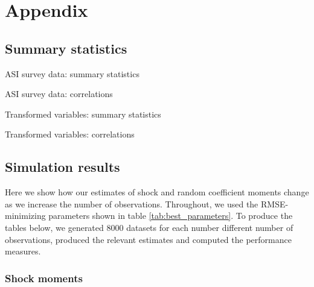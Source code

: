 \section{Appendix}

\subsection{Summary statistics} \label{sec:summary_statistics}



\begin{table}[H]
  \singlespacing
  \caption{ASI survey data: summary statistics}
  
  \label{tab:summary_statistics_raw1}
\end{table}

\begin{table}[H]
  \singlespacing
  \caption{ASI survey data: correlations}
  
  \label{tab:summary_statistics_raw2}
\end{table}


\begin{table}[H]
  \singlespacing
  \caption{Transformed variables: summary statistics}
  
  \label{tab:summary_statistics_processed1}
\end{table}

\begin{table}[H]
  \singlespacing
  \caption{Transformed variables: correlations}
  
  \label{tab:summary_statistics_processed2}
\end{table}


\subsection{Simulation results}

Here we show how our estimates of shock and random coefficient moments change as we increase the number of observations. Throughout, we used the RMSE-minimizing parameters shown in table \ref{tab:best_parameters}. To produce the tables below, we generated 8000 datasets for each number different number of observations, produced the relevant estimates and computed the performance measures.

\subsubsection*{Shock moments}

